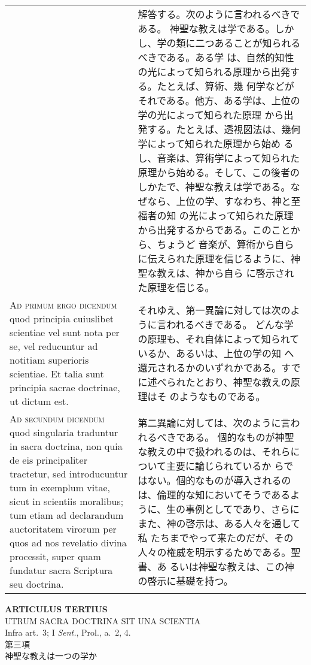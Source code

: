 \documentclass[10pt]{jsarticle} %
\begin{document}
\begin{longtable}{p{21em}p{21em}}
&

解答する。次のように言われるべきである。
神聖な教えは学である。しかし、学の類に二つあることが知られるべきである。ある学
 は、自然的知性の光によって知られる原理から出発する。たとえば、算術、幾
 何学などがそれである。他方、ある学は、上位の学の光によって知られた原理
 から出発する。たとえば、透視図法は、幾何学によって知られた原理から始め
 るし、音楽は、算術学によって知られた原理から始める。そして、この後者の
 しかたで、神聖な教えは学である。なぜなら、上位の学、すなわち、神と至福者の知
 の光によって知られた原理から出発するからである。このことから、ちょうど
 音楽が、算術から自らに伝えられた原理を信じるように、神聖な教えは、神から自ら
 に啓示された原理を信じる。



\\


{\scshape Ad primum ergo dicendum} quod principia
cuiuslibet scientiae vel sunt nota per se, vel reducuntur ad notitiam
superioris scientiae. Et talia sunt principia sacrae doctrinae, ut
dictum est.


&

それゆえ、第一異論に対しては次のように言われるべきである。
どんな学の原理も、それ自体によって知られているか、あるいは、上位の学の知
 へ還元されるかのいずれかである。すでに述べられたとおり、神聖な教えの原理はそ
 のようなものである。

\\


{\scshape Ad secundum dicendum} quod singularia traduntur
in sacra doctrina, non quia de eis principaliter tractetur, sed
introducuntur tum in exemplum vitae, sicut in scientiis moralibus; tum
etiam ad declarandum auctoritatem virorum per quos ad nos revelatio
divina processit, super quam fundatur sacra Scriptura seu doctrina.


&

第二異論に対しては、次のように言われるべきである。
個的なものが神聖な教えの中で扱われるのは、それらについて主要に論じられているか
 らではない。個的なものが導入されるのは、倫理的な知においてそうであるよ
 うに、生の事例としてであり、さらにまた、神の啓示は、ある人々を通して私
 たちまでやって来たのだが、その人々の権威を明示するためである。聖書、あ
 るいは神聖な教えは、この神の啓示に基礎を持つ。




\end{longtable}
\newpage

\begin{center}
 {\Large {\bf ARTICULUS TERTIUS}}\\
 {\large UTRUM SACRA DOCTRINA SIT UNA SCIENTIA}\\
 {\footnotesize Infra art.~3; I {\itshape Sent.}, Prol., a.~2, 4.}\\
 {\Large 第三項\\神聖な教えは一つの学か}
\end{center}
\end{document}
